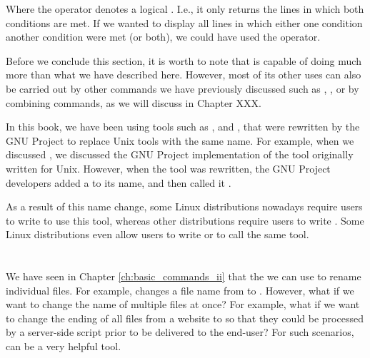 
Where the \mycommand{\&\&} operator denotes a logical . I.e., it only returns the lines in which both conditions are met. If we wanted to display all lines in which either one condition  another condition were met (or both), we could have used the \mycommand{||} operator.

Before we conclude this section, it is worth to note that  is capable of doing much more than what we have described here. However, most of its other uses can also be carried out by other commands we have previously discussed such as , , or by combining commands, as we will discuss in Chapter XXX.

\begin{my_box}
In this book, we have been using tools such as , and , that were rewritten by the GNU Project to replace Unix tools with the same name. For example, when we discussed , we discussed the GNU Project implementation of the  tool originally written for Unix. However, when the  tool was rewritten, the GNU Project developers added a  to its name, and then called it .

As a result of this name change, some Linux distributions nowadays require users to write  to use this tool, whereas other distributions require users to write . Some Linux distributions even allow users to write  or  to call the same tool.
\end{my_box}

\section{}

We have seen in Chapter \ref{ch:basic_commands_ii} that the we can use  to rename individual files. For example,  changes a file name from  to . However, what if we want to change the name of multiple files at once? For example, what if we want to change the ending of all  files from a website to  so that they could be processed by a server-side script prior to be delivered to the end-user? For such scenarios,  can be a very helpful tool.


